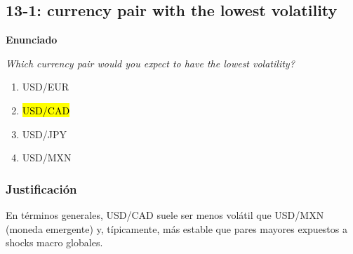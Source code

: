 ﻿\subsection{13-1: currency pair with the lowest volatility}

\textbf{Enunciado}

\emph{Which currency pair would you expect to have the lowest volatility?}
\begin{enumerate}[label=\alph*.]
\item USD/EUR
\item \hl{USD/CAD}
\item USD/JPY
\item USD/MXN
\end{enumerate}

\subsubsection*{Justificación}

En términos generales, USD/CAD suele ser menos volátil que USD/MXN (moneda emergente) y, típicamente, más estable que pares mayores expuestos a shocks macro globales.











